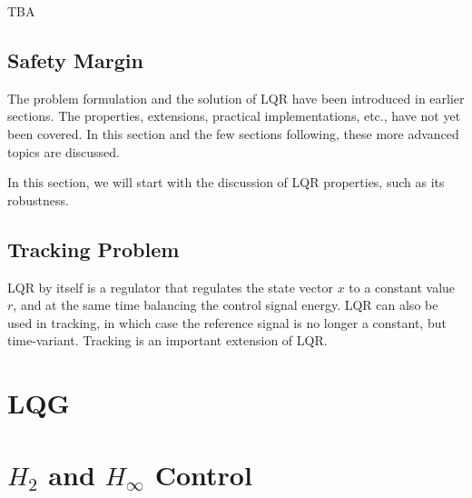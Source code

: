 TBA

\subsection{Safety Margin}

The problem formulation and the solution of LQR have been introduced in earlier sections. The properties, extensions, practical implementations, etc., have not yet been covered. In this section and the few sections following, these more advanced topics are discussed.

In this section, we will start with the discussion of LQR properties, such as its robustness.

\subsection{Tracking Problem}

LQR by itself is a regulator that regulates the state vector $x$ to a constant value $r$, and at the same time balancing the control signal energy. LQR can also be used in tracking, in which case the reference signal is no longer a constant, but time-variant. Tracking is an important extension of LQR.






























 

\section{LQG}

\section{$H_2$ and $H_\infty$ Control} 
